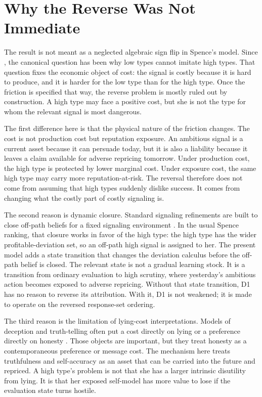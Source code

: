 
\section{Why the Reverse Was Not Immediate}
\label{sec:why-not-before}

The result is not meant as a neglected algebraic sign flip in Spence's model. Since \citet{spence1973job}, the canonical question has been why low types cannot imitate high types. That question fixes the economic object of cost: the signal is costly because it is hard to produce, and it is harder for the low type than for the high type. Once the friction is specified that way, the reverse problem is mostly ruled out by construction. A high type may face a positive cost, but she is not the type for whom the relevant signal is most dangerous.

The first difference here is that the physical nature of the friction changes. The cost is not production cost but reputation exposure. An ambitious signal is a current asset because it can persuade today, but it is also a liability because it leaves a claim available for adverse repricing tomorrow. Under production cost, the high type is protected by lower marginal cost. Under exposure cost, the same high type may carry more reputation-at-risk. The reversal therefore does not come from assuming that high types suddenly dislike success. It comes from changing what the costly part of costly signaling is.

The second reason is dynamic closure. Standard signaling refinements are built to close off-path beliefs for a fixed signaling environment \citep{cho1987signaling,banks1987equilibrium}. In the usual Spence ranking, that closure works in favor of the high type: the high type has the wider profitable-deviation set, so an off-path high signal is assigned to her. The present model adds a state transition that changes the deviation calculus before the off-path belief is closed. The relevant state is not a gradual learning stock. It is a transition from ordinary evaluation to high scrutiny, where yesterday's ambitious action becomes exposed to adverse repricing. Without that state transition, D1 has no reason to reverse its attribution. With it, D1 is not weakened; it is made to operate on the reversed response-set ordering.

The third reason is the limitation of lying-cost interpretations. Models of deception and truth-telling often put a cost directly on lying or a preference directly on honesty \citep{gneezy2005,kartik2009,abeler2019}. Those objects are important, but they treat honesty as a contemporaneous preference or message cost. The mechanism here treats truthfulness and self-accuracy as an asset that can be carried into the future and repriced. A high type's problem is not that she has a larger intrinsic disutility from lying. It is that her exposed self-model has more value to lose if the evaluation state turns hostile.

